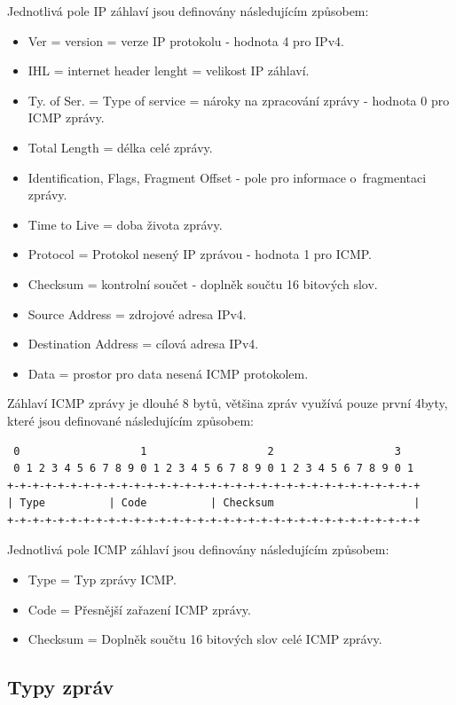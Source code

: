 \documentclass[12pt, a4paper]{article}
\begin{document}
Jednotlivá pole IP záhlaví jsou definovány následujícím způsobem:

\begin{itemize}
\item Ver = version = verze IP protokolu - hodnota 4 pro IPv4.
\item IHL = internet header lenght = velikost IP záhlaví.
\item Ty. of Ser. = Type of service = nároky na zpracování zprávy - hodnota 0 pro ICMP zprávy.
\item Total Length = délka celé zprávy.
\item Identification, Flags, Fragment Offset - pole pro informace o~fragmentaci zprávy.
\item Time to Live = doba života zprávy.
\item Protocol = Protokol nesený IP zprávou - hodnota 1 pro ICMP.
\item Checksum = kontrolní součet - doplněk součtu 16 bitových slov.
\item Source Address = zdrojové adresa IPv4.
\item Destination Address = cílová adresa IPv4.
\item Data = prostor pro data nesená ICMP protokolem.
\end{itemize}

Záhlaví ICMP zprávy je dlouhé 8 bytů, většina zpráv využívá pouze první 4byty, které jsou definované následujícím způsobem:

\begin{verbatim}
 0                   1                   2                   3
 0 1 2 3 4 5 6 7 8 9 0 1 2 3 4 5 6 7 8 9 0 1 2 3 4 5 6 7 8 9 0 1
+-+-+-+-+-+-+-+-+-+-+-+-+-+-+-+-+-+-+-+-+-+-+-+-+-+-+-+-+-+-+-+-+
| Type          | Code          | Checksum                      |
+-+-+-+-+-+-+-+-+-+-+-+-+-+-+-+-+-+-+-+-+-+-+-+-+-+-+-+-+-+-+-+-+
\end{verbatim} 

Jednotlivá pole ICMP záhlaví jsou definovány následujícím způsobem:

\begin{itemize}
\item Type = Typ zprávy ICMP.
\item Code = Přesnější zařazení ICMP zprávy.
\item Checksum = Doplněk součtu 16 bitových slov celé ICMP zprávy.
\end{itemize}

\subsection{Typy zpráv}
\end{document}

